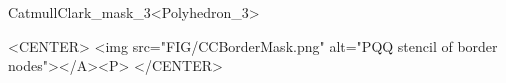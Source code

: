 \begin{ccRefClass}{CatmullClark_mask_3<Polyhedron_3>}
\begin{ccHtmlOnly}
    <CENTER>
      <img src="FIG/CCBorderMask.png" alt="PQQ stencil of border nodes"></A><P>
    </CENTER>
\end{ccHtmlOnly}

\ccSeeAlso

\\

\end{ccRefClass}

\ccRefPageEnd



